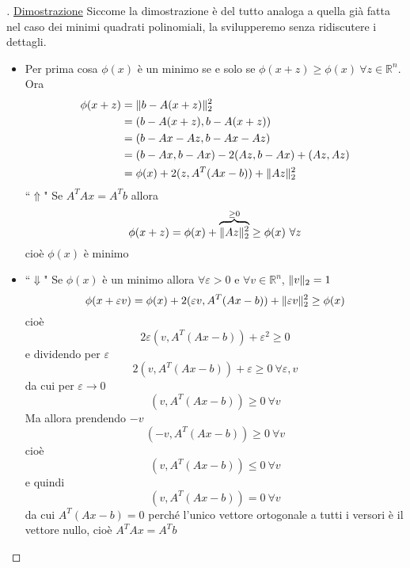 \begin{proof}[\unskip\nopunct]
\uline{Dimostrazione} Siccome la dimostrazione è del tutto analoga a quella già fatta nel caso dei minimi quadrati polinomiali, la svilupperemo senza ridiscutere i dettagli. 
\begin{itemize}
\item Per prima cosa $\phi(x)$ è un minimo se e solo se $\phi(x+z)\geq \phi(x) \ \forall z \in \mathbb{R}^n$. \\
Ora
\begin{equation*}
    \begin{split}
        \phi(x+z) & = \lVert b-A(x+z)\rVert_2^2 \\
        & = (b-A(x+z), b-A(x+z)) \\
        & = (b-Ax-Az, b-Ax-Az) \\
        & = (b-Ax, b-Ax)-2(Az,b-Ax) + (Az, Az) \\
        & = \phi(x) + 2(z,A^T(Ax-b))+\lVert Az\rVert_2^2
    \end{split}
\end{equation*}
``$\Uparrow$" Se $A^TAx=A^Tb$ allora 
\begin{equation*}
    \phi(x+z) = \phi(x) + \overbrace{\lVert Az\rVert_2^2}^{\geq 0} \geq \phi(x) \ \forall z
\end{equation*}
cioè $\phi(x)$ è minimo

\item ``$\Downarrow$" Se $\phi(x)$ è un minimo allora $\forall \varepsilon >0$ e $\forall v \in \mathbb{R}^n$, $\lVert v\rVert_2=1$
\begin{equation*}
    \phi(x+\varepsilon v)=\phi(x) + 2(\varepsilon v, A^T(Ax-b)) + \lVert\varepsilon v\rVert_2^2 \geq \phi(x)
\end{equation*}
cioè
\begin{equation*}
    2\varepsilon(v,A^T(Ax-b))+\varepsilon^2 \geq 0
\end{equation*}
e dividendo per $\varepsilon$
\begin{equation*}
    2(v,A^T(Ax-b))+\varepsilon \geq 0 \ \forall \varepsilon,v
\end{equation*}
da cui per $\varepsilon \to 0$
\begin{equation*}
    (v, A^T(Ax-b)) \geq 0 \ \forall v
\end{equation*}
Ma allora prendendo $-v$
\begin{equation*}
    (-v, A^T(Ax-b)) \geq 0 \ \forall v
\end{equation*}
cioè
\begin{equation*}
    (v, A^T(Ax-b)) \leq 0 \ \forall v
\end{equation*}
e quindi
\begin{equation*}
    (v, A^T(Ax-b)) = 0 \ \forall v
\end{equation*}
da cui $A^T(Ax-b)=0$ perché l'unico vettore ortogonale a tutti i versori è il vettore nullo, cioè $A^TAx=A^Tb$
\end{itemize}
\end{proof}
